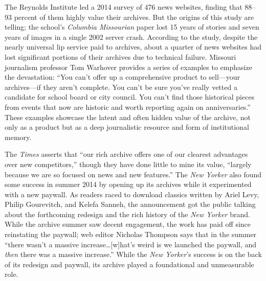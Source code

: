 The Reynolds Institute led a 2014 survey of 476 news websites, finding that 88--93 percent of them highly value their archives. But the origins of this study are telling; the school's \emph{Columbia Missourian} paper lost 15 years of stories and seven years of images in a single 2002 server crash. According to the study, despite the nearly universal lip service paid to archives, about a quarter of news websites had lost significant portions of their archives due to technical failure. Missouri journalism professor Tom Warhover provides a series of examples to emphasize the devastation: ``You can't offer up a comprehensive product to sell---your archives---if they aren't complete. You can't be sure you've really vetted a candidate for school board or city council. You can't find those historical pieces from events that now are historic and worth reporting again on anniversaries.''\autocite{mccain_saving_2014} These examples showcase the latent and often hidden value of the archive, not only as a product but as a deep journalistic resource and form of institutional memory.

The \emph{Times} asserts that ``our rich archive offers one of our clearest advantages over new competitors,'' though they have done little to mine its value, ``largely because we are so focused on news and new features.''\autocite[28]{_innovation_2014}  The \emph{New Yorker} also found some success in summer 2014 by opening up its archives while it experimented with a new paywall. As readers raced to download classics written by Ariel Levy, Philip Gourevitch, and Kelefa Sanneh, the announcement got the public talking about the forthcoming redesign and the rich history of the \emph{New Yorker} brand. While the archive summer saw decent engagement, the work has paid off since reinstating the paywall; web editor Nicholas Thompson says that in the summer ``there wasn't a massive increase\ldots[w]hat's weird is we launched the paywall, and \emph{then} there was a massive increase.''\autocite{ellis_after_2015} While the \emph{New Yorker}'s success is on the back of its redesign and paywall, its archive played a foundational and unmeasurable role.

